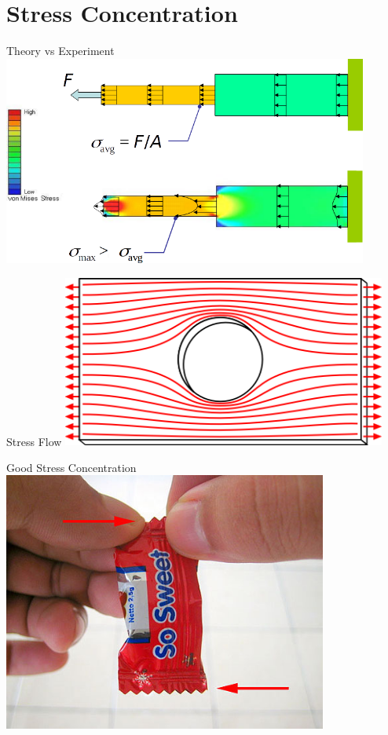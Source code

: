 \documentclass[10pt, svgnames]{beamer}
\begin{document}
\section{Stress Concentration}
\label{sec:org925f0f9}

\begin{frame}[label={sec:orge72df39}]{Theory vs Experiment}
\centering
\includegraphics[width=0.9\textwidth]{pictures/theory-experiment}
\end{frame}

\begin{frame}[label={sec:org255b99e}]{Stress Flow}
\centering
\includegraphics[width=0.8\textwidth]{pictures/force-flow}
\end{frame}

\begin{frame}[label={sec:org8a1357c}]{Good Stress Concentration}
\centering
\includegraphics[width=0.8\textwidth]{pictures/good-stress-conc}
\end{frame}
\end{document}
